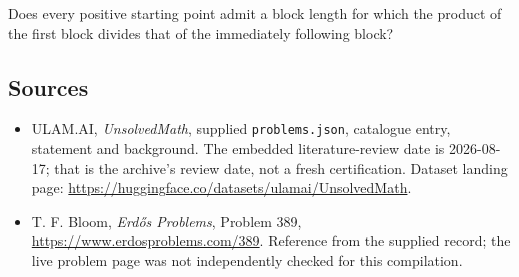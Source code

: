 \documentclass[11pt,a4paper]{article}
\begin{document}
Does every positive starting point admit a block length for which the product of the first block divides that of the immediately following block?

\subsection{Sources}

{\small

\begin{itemize}

\item[\hypertarget{source:statement:1}{S1}] ULAM.AI, \emph{UnsolvedMath}, supplied \texttt{problems.json}, catalogue entry, statement and background. The embedded literature-review date is 2026-08-17; that is the archive’s review date, not a fresh certification. Dataset landing page: \url{https://huggingface.co/datasets/ulamai/UnsolvedMath}.

\item[\hypertarget{source:statement:2}{S2}] T. F. Bloom, \emph{Erdős Problems}, Problem 389, \url{https://www.erdosproblems.com/389}. Reference from the supplied record; the live problem page was not independently checked for this compilation.

\end{itemize}

}

\label{end:statement}
\end{document}
